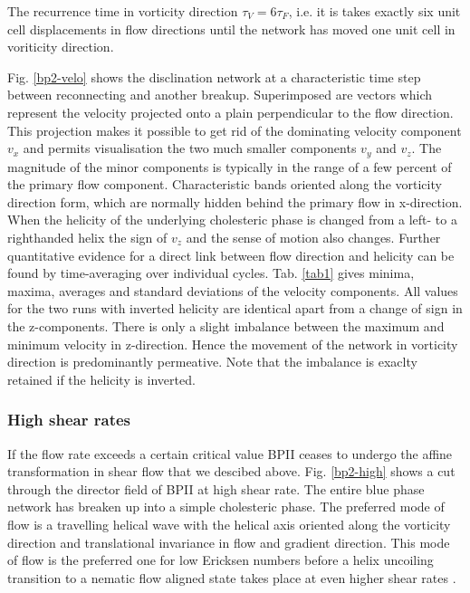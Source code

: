 \documentclass[aps,pre,reprint,superscriptaddress, twocolumn]{revtex4}
\begin{document}
The recurrence time in vorticity direction $\tau_V=6\tau_F$, 
i.e. it is takes exactly six unit cell displacements in flow directions 
until the network has moved one unit cell in voriticity direction.

Fig. \ref{bp2-velo} shows the disclination network at a characteristic time step between reconnecting and another breakup.
Superimposed are vectors which represent the velocity projected onto a plain perpendicular to the flow direction.
This projection makes it possible to get rid of the dominating velocity component $v_x$ and permits visualisation the 
two much smaller components $v_y$ and $v_z$.
The magnitude of the minor components is typically in the range of a few percent of the primary flow component.
Characteristic bands oriented along the vorticity direction form, which are normally hidden behind the primary flow in x-direction.
When the helicity of the underlying cholesteric phase is changed from a left- to a righthanded helix the sign of $v_z$ 
and the sense of motion also changes.
Further quantitative evidence for a direct link between flow direction and helicity can be found by time-averaging over
individual cycles.
Tab. \ref{tab1} gives minima, maxima, averages and standard deviations of the velocity components.
All values for the two runs with inverted helicity are identical apart from a change of sign in the z-components.
There is only a slight imbalance between the maximum and minimum velocity in z-direction.
Hence the movement of the network in vorticity direction is predominantly permeative.
Note that the imbalance is exaclty retained if the helicity is inverted.


\subsubsection{High shear rates}

If the flow rate exceeds a certain critical value BPII ceases to undergo the affine transformation in shear flow that we
descibed above. Fig. \ref{bp2-high} shows a cut through the director field of BPII at high shear rate.
The entire blue phase network has breaken up into a simple cholesteric phase. The preferred mode of flow is 
a travelling helical wave with the helical axis oriented along the vorticity direction and translational 
invariance in flow and gradient direction. This mode of flow is the preferred one for low Ericksen numbers
before a helix uncoiling transition to a nematic flow aligned state takes place at even higher
shear rates \cite{Rey:1996a, Rey:1996b}.
\end{document}
